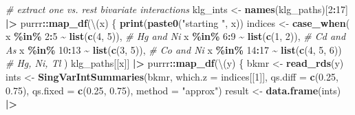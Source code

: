 \documentclass[12pt, twoside]{amherstthesis}
\newenvironment{Shaded}{\begin{snugshade}}{\end{snugshade}}
\newcommand{\AttributeTok}[1]{\textcolor[rgb]{0.13,0.29,0.53}{#1}}
\newcommand{\CommentTok}[1]{\textcolor[rgb]{0.56,0.35,0.01}{\textit{#1}}}
\newcommand{\DecValTok}[1]{\textcolor[rgb]{0.00,0.00,0.81}{#1}}
\newcommand{\FloatTok}[1]{\textcolor[rgb]{0.00,0.00,0.81}{#1}}
\newcommand{\FunctionTok}[1]{\textcolor[rgb]{0.13,0.29,0.53}{\textbf{#1}}}
\newcommand{\NormalTok}[1]{#1}
\newcommand{\OtherTok}[1]{\textcolor[rgb]{0.56,0.35,0.01}{#1}}
\newcommand{\SpecialCharTok}[1]{\textcolor[rgb]{0.81,0.36,0.00}{\textbf{#1}}}
\newcommand{\StringTok}[1]{\textcolor[rgb]{0.31,0.60,0.02}{#1}}
\begin{document}
\begin{Shaded}
\begin{Highlighting}[]
\CommentTok{\# extract one vs. rest bivariate interactions}
\NormalTok{klg\_ints }\OtherTok{\textless{}{-}} \FunctionTok{names}\NormalTok{(klg\_paths)[}\DecValTok{2}\SpecialCharTok{:}\DecValTok{17}\NormalTok{] }\SpecialCharTok{|\textgreater{}} 
\NormalTok{  purrr}\SpecialCharTok{::}\FunctionTok{map\_df}\NormalTok{(\textbackslash{}(x) \{}
    \FunctionTok{print}\NormalTok{(}\FunctionTok{paste0}\NormalTok{(}\StringTok{"starting "}\NormalTok{, x))}
\NormalTok{    indices }\OtherTok{\textless{}{-}} \FunctionTok{case\_when}\NormalTok{(}
\NormalTok{      x }\SpecialCharTok{\%in\%} \DecValTok{2}\SpecialCharTok{:}\DecValTok{5} \SpecialCharTok{\textasciitilde{}} \FunctionTok{list}\NormalTok{(}\FunctionTok{c}\NormalTok{(}\DecValTok{4}\NormalTok{, }\DecValTok{5}\NormalTok{)), }\CommentTok{\# Hg and Ni}
\NormalTok{      x }\SpecialCharTok{\%in\%} \DecValTok{6}\SpecialCharTok{:}\DecValTok{9} \SpecialCharTok{\textasciitilde{}} \FunctionTok{list}\NormalTok{(}\FunctionTok{c}\NormalTok{(}\DecValTok{1}\NormalTok{, }\DecValTok{2}\NormalTok{)), }\CommentTok{\# Cd and As}
\NormalTok{      x }\SpecialCharTok{\%in\%} \DecValTok{10}\SpecialCharTok{:}\DecValTok{13} \SpecialCharTok{\textasciitilde{}} \FunctionTok{list}\NormalTok{(}\FunctionTok{c}\NormalTok{(}\DecValTok{3}\NormalTok{, }\DecValTok{5}\NormalTok{)), }\CommentTok{\# Co and Ni}
\NormalTok{      x }\SpecialCharTok{\%in\%} \DecValTok{14}\SpecialCharTok{:}\DecValTok{17} \SpecialCharTok{\textasciitilde{}} \FunctionTok{list}\NormalTok{(}\FunctionTok{c}\NormalTok{(}\DecValTok{4}\NormalTok{, }\DecValTok{5}\NormalTok{, }\DecValTok{6}\NormalTok{)) }\CommentTok{\# Hg, Ni, Tl}
\NormalTok{    )}
\NormalTok{    klg\_paths[[x]] }\SpecialCharTok{|\textgreater{}} 
\NormalTok{      purrr}\SpecialCharTok{::}\FunctionTok{map\_df}\NormalTok{(\textbackslash{}(y) \{}
\NormalTok{        bkmr }\OtherTok{\textless{}{-}} \FunctionTok{read\_rds}\NormalTok{(y)}
\NormalTok{        ints }\OtherTok{\textless{}{-}} \FunctionTok{SingVarIntSummaries}\NormalTok{(bkmr, }
                                    \AttributeTok{which.z =}\NormalTok{ indices[[}\DecValTok{1}\NormalTok{]], }
                                    \AttributeTok{qs.diff =} \FunctionTok{c}\NormalTok{(}\FloatTok{0.25}\NormalTok{, }\FloatTok{0.75}\NormalTok{), }
                                    \AttributeTok{qs.fixed =} \FunctionTok{c}\NormalTok{(}\FloatTok{0.25}\NormalTok{, }\FloatTok{0.75}\NormalTok{),}
                                    \AttributeTok{method =} \StringTok{"approx"}\NormalTok{)}
\NormalTok{        result }\OtherTok{\textless{}{-}} \FunctionTok{data.frame}\NormalTok{(ints) }\SpecialCharTok{|\textgreater{}} 

\end{Highlighting}
\end{Shaded}
\end{document}
